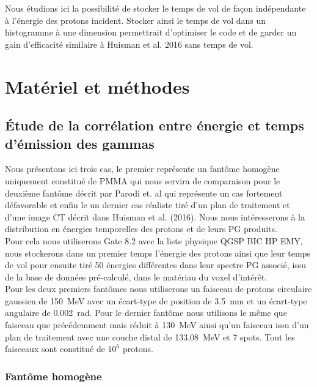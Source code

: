 \documentclass[11pt,a4paper,oldfontcommands]{memoir}
\begin{document}
 Nous étudions ici la possibilité de stocker le temps de vol de façon indépendante à l'énergie des protons incident. Stocker ainsi le temps de vol dans un histogramme à une dimension permettrait d'optimiser le code et de garder un gain d'efficacité similaire à Huisman et al. 2016 sans temps de vol. 


\section{Matériel et méthodes}

\subsection{\'Etude de la corrélation entre énergie et temps d'émission des gammas}

Nous présentons ici trois cas, le premier représente un fantôme homogène uniquement constitué de PMMA qui nous servira de comparaison pour le deuxième fantôme décrit par Parodi et. al \cite{1487723} qui représente un cas fortement défavorable et enfin le un dernier cas réaliste tiré d'un plan de traitement et d'une image CT décrit dans Huisman et al. (2016). Nous nous intéresserons à la distribution en énergies temporelles des protons et de leurs PG produits.\\ Pour cela nous utiliserons Gate 8.2 avec la liste physique QGSP BIC HP EMY, nous stockerons dans un premier temps l'énergie des protons ainsi que leur temps de vol pour ensuite tiré 50 énergies différentes dans leur spectre PG associé, issu de la base de données pré-calculé, dans le matériau du voxel d'intérêt.\\
Pour les deux premiers fantômes nous utiliserons un faisceau de protons circulaire gaussien de 150~MeV avec un écart-type de position de 3.5~mm et un écart-type angulaire de 0.002~rad. Pour le dernier fantôme nous utilisons le même que faisceau que précédemment mais réduit à 130~MeV ainsi qu'un faisceau issu d'un plan de traitement avec une couche distal de 133.08~MeV et 7 spots. Tout les faisceaux sont constitué de $10^6$ protons. 

\subsubsection{Fantôme homogène}
\end{document}
